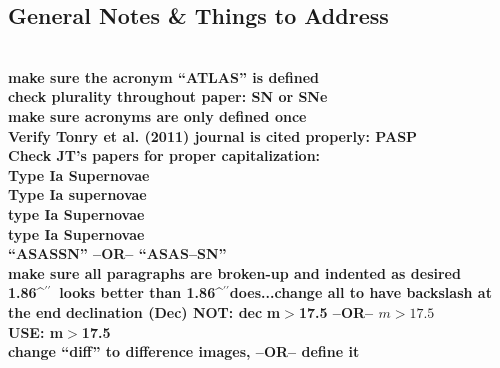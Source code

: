 \documentclass[aps,prb,twocolumn,superscriptaddress]{revtex4-1}
\def\arcsec{\ifmmode^{\prime\prime}\else$^{\prime\prime}$\fi}
\begin{document}
\clearpage
\begin{widetext} %
 \section{General Notes \& Things to Address}
 \\
 {\bf make sure the acronym ``ATLAS'' is defined\\}
 {\bf check plurality throughout paper: SN or SNe\\}
 {\bf make sure acronyms are only defined once\\}
 {\bf Verify Tonry et al. (2011) journal is cited properly: PASP\\}
 {\bf Check JT's papers for proper capitalization:\\
 \indent Type Ia Supernovae\\
 \indent Type Ia supernovae\\
 \indent type Ia Supernovae\\
 \indent type Ia Supernovae\\}
 {\bf ``ASASSN'' --OR-- ``ASAS--SN''\\}
 {\bf make sure all paragraphs are broken-up and indented as desired\\}
 {\bf 1.86\arcsec\ looks better than 1.86\arcsec does...change all to have backslash at the end}
 {\bf declination (Dec) NOT: dec}
 {\bf m$>$17.5 --OR-- $m>17.5$\\
 \indent USE: m$>$17.5}\\
 {\bf change ``diff'' to difference images, --OR-- define it}\\ 
\end{widetext}

\newpage

\newpage
\end{document}
